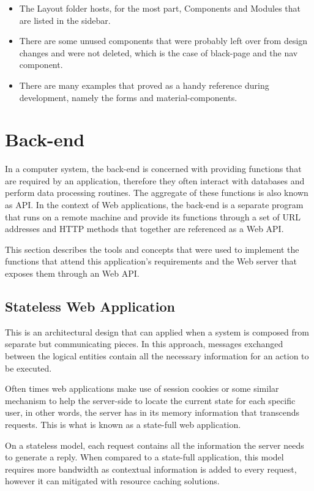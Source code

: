 \begin{itemize}
\item The Layout folder hosts, for the most part, Components and Modules that are listed in the sidebar.\item There are some unused components that were probably left over from design changes and were not deleted, which is the case of black-page and the nav component.
\item There are many examples that proved as a handy reference during development, namely the forms and material-components.
\end{itemize}

\section{Back-end}\label{cha:concepts:sec:backend}
In a computer system, the back-end is concerned with providing functions that are required by an application, therefore they often interact with databases and perform data processing routines. The aggregate of these functions is also known as \gls{API}. In the context of Web applications, the back-end is a separate program that runs on a remote machine and provide its functions through a set of \gls{URL} addresses and \gls{HTTP} methods that together are referenced as a Web \gls{API}.

This section describes the tools and concepts that were used to implement the functions that attend this application's requirements and the Web server that exposes them through an Web \gls{API}.

\subsection{Stateless Web Application}
This is an architectural design that can applied when a system is composed from separate but communicating pieces. In this approach, messages exchanged between the logical entities contain all the necessary information for an action to be executed.

Often times web applications make use of session cookies or some similar mechanism to help the server-side to locate the current state for each specific user, in other words, the server has in its memory information that transcends requests. This is what is known as a state-full web application.

On a stateless model, each request contains all the information the server needs to generate a reply. When compared to a state-full application, this model requires more bandwidth as contextual information is added to every request, however it can mitigated with resource caching solutions.

